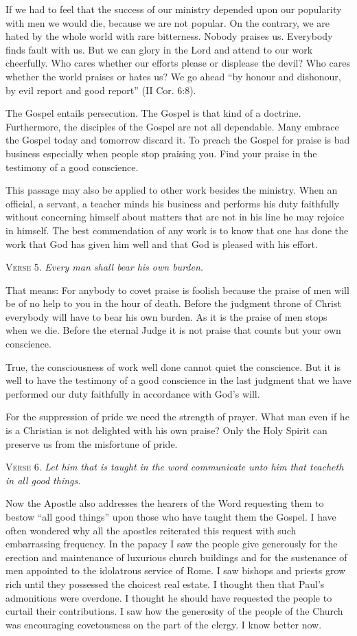 If we had to feel that the success of our ministry depended upon our popularity with men we would die, because we are not popular. On the contrary, we are hated by the whole world with rare bitterness. Nobody praises us. Everybody finds fault with us. But we can glory in the Lord and attend to our work cheerfully. Who cares whether our efforts please or displease the devil? Who cares whether the world praises or hates us? We go ahead “by honour and dishonour, by evil report and good report” (II Cor. 6:8).

The Gospel entails persecution. The Gospel is that kind of a doctrine. Furthermore, the disciples of the Gospel are not all dependable. Many embrace the Gospel today and tomorrow discard it. To preach the Gospel for praise is bad business especially when people stop praising you. Find your praise in the testimony of a good conscience.

This passage may also be applied to other work besides the ministry. When an official, a servant, a teacher minds his business and performs his duty faithfully without concerning himself about matters that are not in his line he may rejoice in himself. The best commendation of any work is to know that one has done the work that God has given him well and that God is pleased with his effort.

\textsc{Verse} 5. \emph{Every man shall bear his own burden.}

That means: For anybody to covet praise is foolish because the praise of men will be of no help to you in the hour of death. Before the judgment throne of Christ everybody will have to bear his own burden. As it is the praise of men stops when we die. Before the eternal Judge it is not praise that counts but your own conscience.

True, the consciousness of work well done cannot quiet the conscience. But it is well to have the testimony of a good conscience in the last judgment that we have performed our duty faithfully in accordance with God’s will.

For the suppression of pride we need the strength of prayer. What man even if he is a Christian is not delighted with his own praise? Only the Holy Spirit can preserve us from the misfortune of pride.

\textsc{Verse} 6. \emph{Let him that is taught in the word communicate unto him that teacheth in all good things.}

Now the Apostle also addresses the hearers of the Word requesting them to bestow “all good things” upon those who have taught them the Gospel. I have often wondered why all the apostles reiterated this request with such embarrassing frequency. In the papacy I saw the people give generously for the erection and maintenance of luxurious church buildings and for the sustenance of men appointed to the idolatrous service of Rome. I saw bishops and priests grow rich until they possessed the choicest real estate. I thought then that Paul’s admonitions were overdone. I thought he should have requested the people to curtail their contributions. I saw how the generosity of the people of the Church was encouraging covetousness on the part of the clergy. I know better now.

